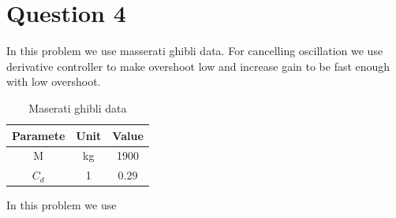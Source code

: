 \section{Question 4}
In this problem we use masserati ghibli data. For cancelling oscillation we use derivative controller to make overshoot low and increase gain to be fast enough with low overshoot.
\begin{center}
    \begin{table}[H]\caption{Maserati ghibli data}
        \centering
        \begin{tabular}{ c c c }
            \hline
            Paramete & Unit & Value \\ 
            \hline
            M & kg & 1900 \\
            $C_d$ & 1 & 0.29\\
            \hline
           \end{tabular}
    \end{table}
\end{center}
In this problem we use 
\newpage
